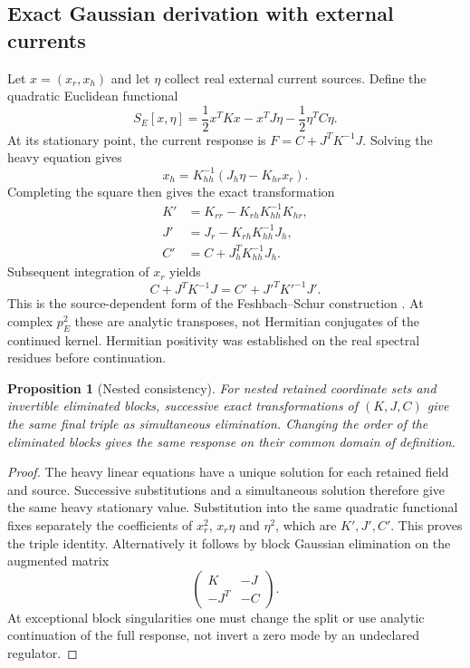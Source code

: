 \documentclass[11pt]{article}
\newtheorem{proposition}{Proposition}
\begin{document}
\subsection{Exact Gaussian derivation with external currents}
Let $x=(x_r,x_h)$ and let $\eta$ collect real external current sources.
Define the quadratic Euclidean functional
\begin{equation}
 S_E[x,\eta]=\frac12x^TKx-x^TJ\eta-\frac12\eta^TC\eta.
\end{equation}
At its stationary point, the current response is
$F=C+J^TK^{-1}J$. Solving the heavy equation gives
\begin{equation}
 x_h=K_{hh}^{-1}(J_h\eta-K_{hr}x_r).
\end{equation}
Completing the square then gives the exact transformation
\begin{align}
 K'&=K_{rr}-K_{rh}K_{hh}^{-1}K_{hr},\label{eq:schurk}\\
 J'&=J_r-K_{rh}K_{hh}^{-1}J_h,\label{eq:schurj}\\
 C'&=C+J_h^TK_{hh}^{-1}J_h.\label{eq:schurc}
\end{align}
Subsequent integration of $x_r$ yields
\begin{equation}
 \boxed{C+J^TK^{-1}J=C'+J'^TK'^{-1}J'.} \label{eq:response}
\end{equation}
This is the source-dependent form of the Feshbach--Schur construction
\cite{feshbach,cde}. At complex $p_E^2$ these are analytic transposes,
not Hermitian conjugates of the continued kernel. Hermitian positivity
was established on the real spectral residues before continuation.

\begin{proposition}[Nested consistency]
For nested retained coordinate sets and invertible eliminated blocks,
successive exact transformations of $(K,J,C)$ give the same final triple
as simultaneous elimination. Changing the order of the eliminated
blocks gives the same response on their common domain of definition.
\end{proposition}
\begin{proof}
The heavy linear equations have a unique solution for each retained
field and source. Successive substitutions and a simultaneous solution
therefore give the same heavy stationary value. Substitution into the
same quadratic functional fixes separately the coefficients of
$x_r^2$, $x_r\eta$ and $\eta^2$, which are $K',J',C'$. This proves the
triple identity. Alternatively it follows by block Gaussian elimination
on the augmented matrix
\begin{equation}
 \begin{pmatrix}K&-J\\-J^T&-C\end{pmatrix}.
\end{equation}
At exceptional block singularities one must change the split or use
analytic continuation of the full response, not invert a zero mode by
an undeclared regulator.
\end{proof}
\end{document}
